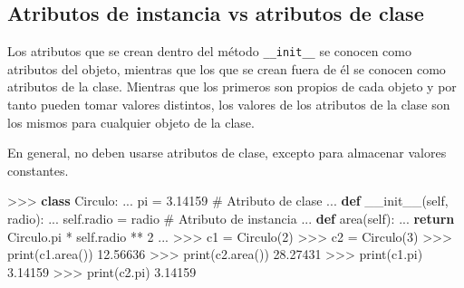 \documentclass[
  spanish,
  a4paper,
]{scrreport}
\newenvironment{Shaded}{\begin{snugshade}}{\end{snugshade}}
\newcommand{\BuiltInTok}[1]{\textcolor[rgb]{0.00,0.23,0.31}{#1}}
\newcommand{\CommentTok}[1]{\textcolor[rgb]{0.37,0.37,0.37}{#1}}
\newcommand{\ControlFlowTok}[1]{\textcolor[rgb]{0.00,0.23,0.31}{\textbf{#1}}}
\newcommand{\DecValTok}[1]{\textcolor[rgb]{0.68,0.00,0.00}{#1}}
\newcommand{\FloatTok}[1]{\textcolor[rgb]{0.68,0.00,0.00}{#1}}
\newcommand{\FunctionTok}[1]{\textcolor[rgb]{0.28,0.35,0.67}{#1}}
\newcommand{\KeywordTok}[1]{\textcolor[rgb]{0.00,0.23,0.31}{\textbf{#1}}}
\newcommand{\NormalTok}[1]{\textcolor[rgb]{0.00,0.23,0.31}{#1}}
\newcommand{\OperatorTok}[1]{\textcolor[rgb]{0.37,0.37,0.37}{#1}}
\newcommand{\VariableTok}[1]{\textcolor[rgb]{0.07,0.07,0.07}{#1}}
\begin{document}
\subsection{Atributos de instancia vs atributos de
clase}\label{atributos-de-instancia-vs-atributos-de-clase}

Los atributos que se crean dentro del método \texttt{\_\_init\_\_} se
conocen como atributos del objeto, mientras que los que se crean fuera
de él se conocen como atributos de la clase. Mientras que los primeros
son propios de cada objeto y por tanto pueden tomar valores distintos,
los valores de los atributos de la clase son los mismos para cualquier
objeto de la clase.

\begin{tcolorbox}[enhanced jigsaw, arc=.35mm, bottomrule=.15mm, bottomtitle=1mm, breakable, colback=white, colbacktitle=quarto-callout-warning-color!10!white, colframe=quarto-callout-warning-color-frame, coltitle=black, left=2mm, leftrule=.75mm, opacityback=0, opacitybacktitle=0.6, rightrule=.15mm, title=\textcolor{quarto-callout-warning-color}{\faExclamationTriangle}\hspace{0.5em}{Advertencia}, titlerule=0mm, toprule=.15mm, toptitle=1mm]

En general, no deben usarse atributos de clase, excepto para almacenar
valores constantes.

\end{tcolorbox}

\begin{Shaded}
\begin{Highlighting}[]
\OperatorTok{\textgreater{}\textgreater{}\textgreater{}} \KeywordTok{class}\NormalTok{ Circulo:}
\NormalTok{...     pi }\OperatorTok{=} \FloatTok{3.14159}                     \CommentTok{\# Atributo de clase}
\NormalTok{...     }\KeywordTok{def} \FunctionTok{\_\_init\_\_}\NormalTok{(}\VariableTok{self}\NormalTok{, radio):}
\NormalTok{...         }\VariableTok{self}\NormalTok{.radio }\OperatorTok{=}\NormalTok{ radio           }\CommentTok{\# Atributo de instancia}
\NormalTok{...     }\KeywordTok{def}\NormalTok{ area(}\VariableTok{self}\NormalTok{):}
\NormalTok{...         }\ControlFlowTok{return}\NormalTok{ Circulo.pi }\OperatorTok{*} \VariableTok{self}\NormalTok{.radio }\OperatorTok{**} \DecValTok{2}
\NormalTok{... }
\OperatorTok{\textgreater{}\textgreater{}\textgreater{}}\NormalTok{ c1 }\OperatorTok{=}\NormalTok{ Circulo(}\DecValTok{2}\NormalTok{)}
\OperatorTok{\textgreater{}\textgreater{}\textgreater{}}\NormalTok{ c2 }\OperatorTok{=}\NormalTok{ Circulo(}\DecValTok{3}\NormalTok{)}
\OperatorTok{\textgreater{}\textgreater{}\textgreater{}} \BuiltInTok{print}\NormalTok{(c1.area())}
\FloatTok{12.56636}
\OperatorTok{\textgreater{}\textgreater{}\textgreater{}} \BuiltInTok{print}\NormalTok{(c2.area())}
\FloatTok{28.27431}
\OperatorTok{\textgreater{}\textgreater{}\textgreater{}} \BuiltInTok{print}\NormalTok{(c1.pi)}
\FloatTok{3.14159}
\OperatorTok{\textgreater{}\textgreater{}\textgreater{}} \BuiltInTok{print}\NormalTok{(c2.pi)}
\FloatTok{3.14159}
\end{Highlighting}
\end{Shaded}
\end{document}
